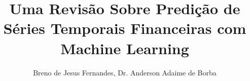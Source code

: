 
\sloppy

\title{Uma Revisão Sobre Predição de Séries Temporais Financeiras com Machine Learning}

\author{Breno de Jesus Fernandes, Dr. Anderson Adaime de Borba}

\address{
	Ciência da Computação\\
	Faculdade de Computação e Informática\\
	Universidade Presbiteriana Mackenzie\\
	São Paulo -- SP -- Brasil
}

